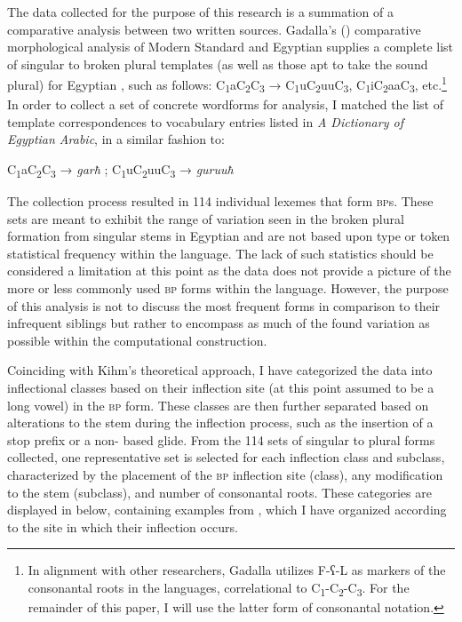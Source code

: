 \documentclass[output=paper,modfonts]{langscibook}
\begin{document}
The data collected for the purpose of this research is a summation of a comparative analysis between two written sources. Gadalla's (\citeyear{Gadalla2004}) comparative morphological analysis of Modern Standard  and Egyptian  supplies a complete list of singular to broken plural templates (as well as those apt to take the sound plural) for Egyptian , such as follows: C\textsubscript{1}aC\textsubscript{2}C\textsubscript{3} → C\textsubscript{1}uC\textsubscript{2}uuC\textsubscript{3}, C\textsubscript{1}iC\textsubscript{2}aaC\textsubscript{3}, etc.\footnote{In alignment with other researchers, Gadalla utilizes F-ʕ{}-L as markers of the consonantal roots in the  languages, correlational to C\textsubscript{1}{}-C\textsubscript{2}{}-C\textsubscript{3}. For the remainder of this paper, I will use the latter form of consonantal notation.} In order to collect a set of concrete wordforms for analysis, I matched the list of template correspondences to vocabulary entries listed in \citet{Badawi1986} \textit{A Dictionary of Egyptian Arabic}, in a similar fashion to:

\ea
{C\textsubscript{1}aC\textsubscript{2}C\textsubscript{3} → \textit{garħ} ; C\textsubscript{1}uC\textsubscript{2}uuC\textsubscript{3} → \textit{guruuħ}}
\z

The collection process resulted in 114 individual lexemes that form \textsc{bp}s. These sets are meant to exhibit the range of variation seen in the broken plural formation from singular stems in Egyptian  and are not based upon type or token statistical frequency within the language. The lack of such statistics should be considered a limitation at this point as the data does not provide a picture of the more or less commonly used \textsc{bp} forms within the language. However, the purpose of this analysis is not to discuss the most frequent forms in comparison to their infrequent siblings but rather to encompass as much of the found variation as possible within the computational construction.

Coinciding with Kihm’s theoretical approach, I have categorized the data into inflectional classes based on their inflection site (at this point assumed to be a long vowel) in the \textsc{bp} form. These classes are then further separated based on  alterations to the stem during the inflection process, such as the insertion of a  stop prefix or a non- based glide. From the 114 sets of singular to plural forms collected, one representative set is selected for each inflection class and subclass, characterized by the placement of the \textsc{bp} inflection site (class), any modification to the stem (subclass), and number of consonantal roots. These categories are displayed in  below, containing examples from \citet{Badawi1986}, which I have organized according to the site in which their inflection occurs. 
\end{document}
